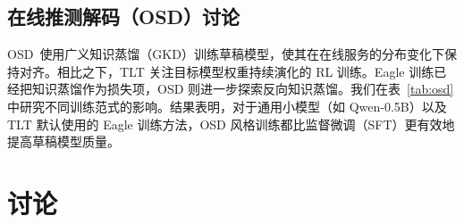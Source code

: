 \documentclass[10pt,twocolumn]{article}
\newcommand{\SysName}{\textrm{TLT}\xspace}
\begin{document}
\begin{table}[t]
\centering\small
\caption{\SysName 中不同 SD 方法的比较。Qwen2.5-7B，TP=2，BS=1，H100；训练成本归一化为 Eagle 单步成本。}
\label{tab:drafters}
\end{table}

\subsection{在线推测解码（OSD）讨论}

OSD~\cite{OSD}使用广义知识蒸馏（GKD）训练草稿模型，使其在在线服务的分布变化下保持对齐。相比之下，\SysName 关注目标模型权重持续演化的 RL 训练。Eagle 训练已经把知识蒸馏作为损失项，OSD 则进一步探索反向知识蒸馏。我们在表~\ref{tab:osd} 中研究不同训练范式的影响。结果表明，对于通用小模型（如 Qwen-0.5B）以及 \SysName 默认使用的 Eagle 训练方法，OSD 风格训练都比监督微调（SFT）更有效地提高草稿模型质量。

\begin{table}[t]
\centering\scriptsize
\caption{OSD 风格训练对不同草稿模型的影响。Qwen2.5-7B 目标模型，H100，TP=2，BS=1。}
\label{tab:osd}
\end{table}

\section{讨论}
\end{document}
